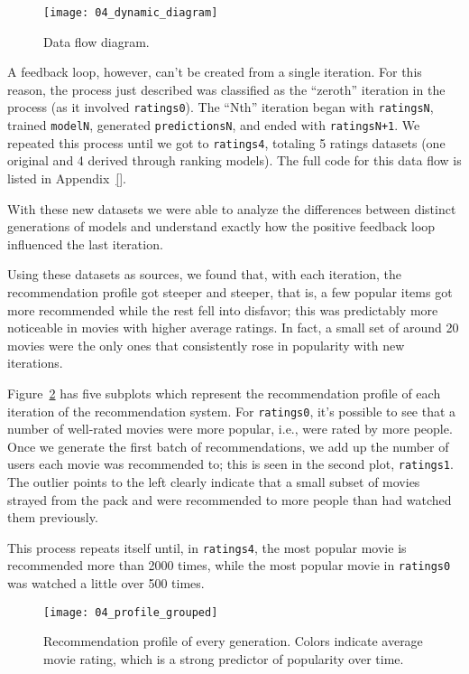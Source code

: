 \begin{figure}
  \centering
  \texttt{[image: 04\_dynamic\_diagram]}
  \caption{Data flow diagram.\label{fig:fig04_dynamic_diagram}}
\end{figure}

A feedback loop, however, can't be created from a single iteration. For this
reason, the process just described was classified as the ``zeroth'' iteration in
the process (as it involved \verb|ratings0|). The ``Nth'' iteration began with
\verb|ratingsN|, trained \verb|modelN|, generated \verb|predictionsN|, and ended
with \verb|ratingsN+1|. We repeated this process until we got to
\verb|ratings4|, totaling 5 ratings datasets (one original and 4 derived through
ranking models). The full code for this data flow is listed in Appendix~\ref{}.

With these new datasets we were able to analyze the differences between distinct
generations of models and understand exactly how the positive feedback loop
influenced the last iteration.

Using these datasets as sources, we found that, with each iteration, the
recommendation profile got steeper and steeper, that is, a few popular items got
more recommended while the rest fell into disfavor; this was predictably more
noticeable in movies with higher average ratings. In fact, a small set of around
20 movies were the only ones that consistently rose in popularity with new
iterations.

Figure~\ref{fig:fig04_profile_grouped} has five subplots which represent the
recommendation profile of each iteration of the recommendation system. For
\verb|ratings0|, it's possible to see that a number of well-rated movies were
more popular, i.e., were rated by more people. Once we generate the first batch
of recommendations, we add up the number of users each movie was recommended to;
this is seen in the second plot, \verb|ratings1|. The outlier points to the left
clearly indicate that a small subset of movies strayed from the pack and were
recommended to more people than had watched them previously.

This process repeats itself until, in \verb|ratings4|, the most popular movie is
recommended more than 2000 times, while the most popular movie in
\verb|ratings0| was watched a little over 500 times.

\begin{figure}
  \centering
  \texttt{[image: 04\_profile\_grouped]}
  \caption{Recommendation profile of every generation. Colors indicate average
  movie rating, which is a strong predictor of popularity over time.
  \label{fig:fig04_profile_grouped}}
\end{figure}

